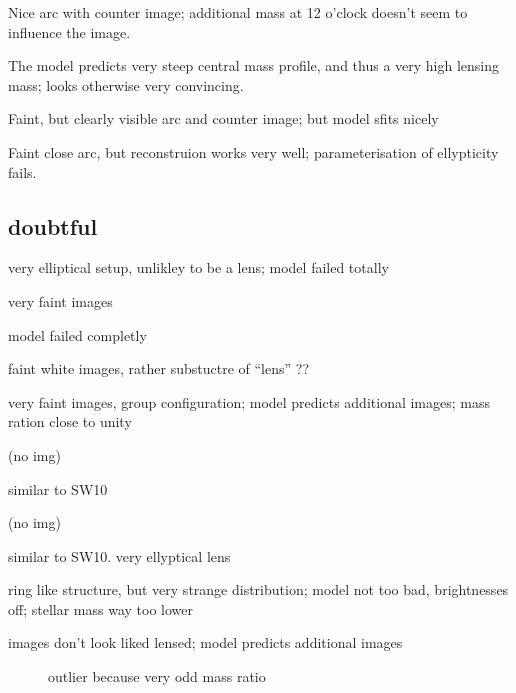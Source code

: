 Nice arc with counter image;
additional mass at 12 o'clock doesn't seem to influence the image.

The model predicts very steep central mass profile, and thus a very high lensing mass;
looks otherwise very convincing.
  
  
Faint, but clearly visible arc and counter image;
but model sfits nicely
 
Faint close arc, but reconstruion works very well;
parameterisation of ellypticity fails.


\subsection{doubtful}

  very elliptical setup, unlikley to be a lens;
  model failed totally
  
  very faint images
  
  model failed completly
  
  faint white images, rather substuctre of ``lens'' ??
  
  very faint images, group configuration;
  model predicts additional images;
  mass ration close to unity
  
  (no img)
  
  similar to SW10
  
  (no img)
  
  similar to SW10. very ellyptical lens
  
  ring like structure, but very strange distribution;
  model not too bad, brightnesses off;
  stellar mass way too lower
  
  images don't look liked lensed;
  model predicts additional images
  



\begin{figure}
  \caption{outlier because very odd mass ratio}
  \label{fig:SW42}
\end{figure}







